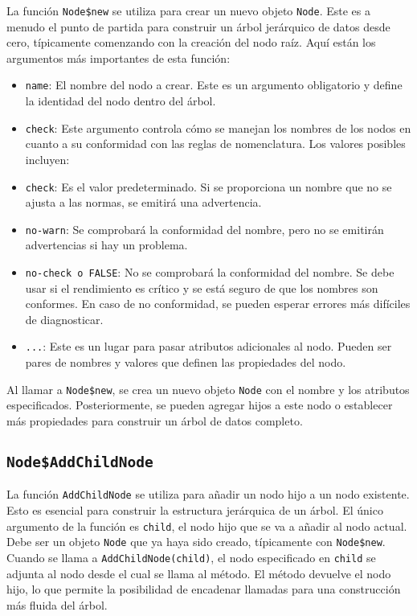 \documentclass[12pt]{report}\usepackage[]{graphicx}\usepackage[dvipsnames]{xcolor}
\begin{document}
			 	La función \texttt{Node\$new} se utiliza para crear un nuevo objeto \texttt{Node}. Este es a menudo el punto de partida para construir un árbol jerárquico de datos desde cero, típicamente comenzando con la creación del nodo raíz. Aquí están los argumentos más importantes de esta función:
			 	
			 	\begin{itemize}
			 		\item \texttt{name}: El nombre del nodo a crear. Este es un argumento obligatorio y define la identidad del nodo dentro del árbol.
			 		\item \texttt{check}: Este argumento controla cómo se manejan los nombres de los nodos en cuanto a su conformidad con las reglas de nomenclatura. Los valores posibles incluyen:
			 		\item \texttt{check}: Es el valor predeterminado. Si se proporciona un nombre que no se ajusta a las normas, se emitirá una advertencia.
			 		\item \texttt{no-warn}: Se comprobará la conformidad del nombre, pero no se emitirán advertencias si hay un problema.
			 		\item \texttt{no-check o FALSE}: No se comprobará la conformidad del nombre. Se debe usar si el rendimiento es crítico y se está seguro de que los nombres son conformes. En caso de no conformidad, se pueden esperar errores más difíciles de diagnosticar.
			 		\item \texttt{...}: Este es un lugar para pasar atributos adicionales al nodo. Pueden ser pares de nombres y valores que definen las propiedades del nodo.
			 	\end{itemize}
			 	
			 	Al llamar a \texttt{Node\$new}, se crea un nuevo objeto \texttt{Node} con el nombre y los atributos especificados. Posteriormente, se pueden agregar hijos a este nodo o establecer más propiedades para construir un árbol de datos completo.
			 	
		 	\subsection{\texttt{Node\$AddChildNode}}
			 	
			 	La función \texttt{AddChildNode} se utiliza para añadir un nodo hijo a un nodo existente. Esto es esencial para construir la estructura jerárquica de un árbol. El único argumento de la función es \texttt{child}, el nodo hijo que se va a añadir al nodo actual. Debe ser un objeto \texttt{Node} que ya haya sido creado, típicamente con \texttt{Node\$new}. Cuando se llama a \texttt{AddChildNode(child)}, el nodo especificado en \texttt{child} se adjunta al nodo desde el cual se llama al método. El método devuelve el nodo hijo, lo que permite la posibilidad de encadenar llamadas para una construcción más fluida del árbol.
			 	
\end{document}
